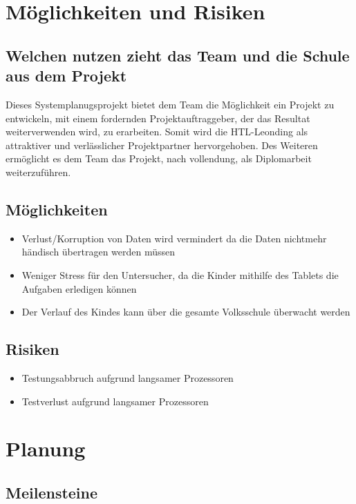 \documentclass[12pt]{article}
\theoremstyle{definition}
\begin{document}
\pagebreak
\section{Möglichkeiten und Risiken}

\subsection{Welchen nutzen zieht das Team und die Schule aus dem Projekt}

Dieses Systemplanugsprojekt bietet dem Team die Möglichkeit ein Projekt zu entwickeln, mit einem fordernden Projektauftraggeber, der das Resultat weiterverwenden wird, zu erarbeiten.
Somit wird die HTL-Leonding als attraktiver und verlässlicher Projektpartner hervorgehoben.
Des Weiteren ermöglicht es dem Team das Projekt, nach vollendung, als Diplomarbeit weiterzuführen.

\subsection{Möglichkeiten}
\begin{itemize}
 \item Verlust/Korruption von Daten wird vermindert da die Daten nichtmehr händisch übertragen werden müssen
 \item Weniger Stress für den Untersucher, da die Kinder mithilfe des Tablets die Aufgaben erledigen können
 \item Der Verlauf des Kindes kann über die gesamte Volksschule überwacht werden
\end{itemize}

\subsection{Risiken}
\begin{itemize}
 \item Testungsabbruch aufgrund langsamer Prozessoren
 \item Testverlust aufgrund langsamer Prozessoren
\end{itemize}



\pagebreak
\section{Planung}
\subsection{Meilensteine}
\end{document}
